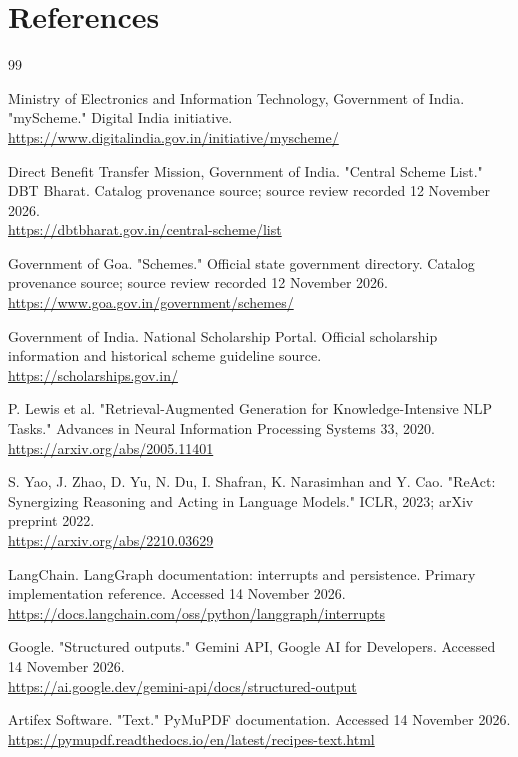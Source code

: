 \documentclass[12pt,a4paper,twoside]{report}
\begin{document}
\clearpage\chapter*{References}\begin{thebibliography}{99}

Ministry of Electronics and Information Technology, Government of India. "myScheme." Digital India initiative.\\\url{https://www.digitalindia.gov.in/initiative/myscheme/}

Direct Benefit Transfer Mission, Government of India. "Central Scheme List." DBT Bharat. Catalog provenance source; source review recorded 12 November 2026.\\\url{https://dbtbharat.gov.in/central-scheme/list}

Government of Goa. "Schemes." Official state government directory. Catalog provenance source; source review recorded 12 November 2026.\\\url{https://www.goa.gov.in/government/schemes/}

Government of India. National Scholarship Portal. Official scholarship information and historical scheme guideline source.\\\url{https://scholarships.gov.in/}

P. Lewis et al. "Retrieval-Augmented Generation for Knowledge-Intensive NLP Tasks." Advances in Neural Information Processing Systems 33, 2020.\\\url{https://arxiv.org/abs/2005.11401}

S. Yao, J. Zhao, D. Yu, N. Du, I. Shafran, K. Narasimhan and Y. Cao. "ReAct: Synergizing Reasoning and Acting in Language Models." ICLR, 2023; arXiv preprint 2022.\\\url{https://arxiv.org/abs/2210.03629}

LangChain. LangGraph documentation: interrupts and persistence. Primary implementation reference. Accessed 14 November 2026.\\\url{https://docs.langchain.com/oss/python/langgraph/interrupts}

Google. "Structured outputs." Gemini API, Google AI for Developers. Accessed 14 November 2026.\\\url{https://ai.google.dev/gemini-api/docs/structured-output}

Artifex Software. "Text." PyMuPDF documentation. Accessed 14 November 2026.\\\url{https://pymupdf.readthedocs.io/en/latest/recipes-text.html}


\end{thebibliography}
\end{document}
